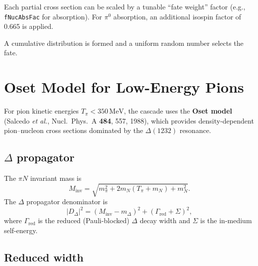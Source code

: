 \documentclass[11pt,a4paper]{article}
\newcommand{\unit}[1]{\,\mathrm{#1}}
\newcommand{\MeV}{\unit{MeV}}
\begin{document}
Each partial cross section can be scaled by a tunable
``fate weight'' factor (e.g., \texttt{fNucAbsFac} for absorption).
For $\pi^{0}$ absorption, an additional isospin factor of 0.665 is
applied.

A cumulative distribution is formed and a uniform random number selects
the fate.

\section{Oset Model for Low-Energy Pions}
\label{sec:oset}

For pion kinetic energies $T_{\pi} < 350\MeV$, the cascade uses the
\textbf{Oset model} (Salcedo \textit{et al.}, Nucl.\ Phys.\ A
\textbf{484}, 557, 1988), which provides density-dependent pion--nucleon
cross sections dominated by the $\Delta(1232)$ resonance.

\subsection{$\Delta$ propagator}

The $\pi N$ invariant mass is
\begin{equation}
  M_{\text{inv}} = \sqrt{m_{\pi}^{2} + 2m_{N}(T_{\pi} + m_{N}) + m_{N}^{2}}.
\end{equation}
The $\Delta$ propagator denominator is
\begin{equation}
  |D_{\Delta}|^{2}
  = (M_{\text{inv}} - m_{\Delta})^{2} + (\Gamma_{\text{red}} + \Sigma)^{2},
\end{equation}
where $\Gamma_{\text{red}}$ is the reduced (Pauli-blocked) $\Delta$ decay
width and $\Sigma$ is the in-medium self-energy.

\subsection{Reduced width}
\end{document}

